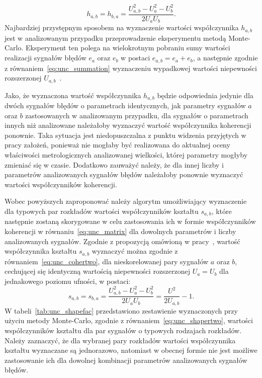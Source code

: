 \begin{equation}
h_{a,b} = h_{b,a} = \frac{U_{a,b}^{2} - U_{a}^{2} - U_{b}^{2}}{2 U_{a} U_{b}} \label{eq:unc_cohertwo}.
\end{equation}
Najbardziej przystępnym sposobem na wyznaczenie wartości współczynnika $h_{a,b}$ jest w analizowanym przypadku przeprowadzenie eksperymentu metodą Monte-Carlo. Eksperyment ten polega na wielokrotnym pobraniu sumy wartości realizacji sygnałów błędów $e_{a}$ oraz $e_{b}$ w postaci $e_{a,b} = e_{a} + e_{b}$, a następnie zgodnie z równaniem~\eqref{eq:unc_summation} wyznaczeniu wypadkowej wartości niepewności rozszerzonej $U_{a,b}$~\cite{jcgm_montecarlo}. 

Jako, że wyznaczona wartość współczynnika $h_{a,b}$ będzie odpowiednia jedynie dla dwóch sygnałów błędów o parametrach identycznych, jak parametry sygnałów $a$ oraz $b$ zastosowanych w analizowanym przypadku, dla sygnałów o parametrach innych niż analizowane należałoby wyznaczyć wartość współczynnika koherencji ponownie. Taka sytuacja jest niedopuszczalna z punktu widzenia przyjętych w pracy założeń, ponieważ nie mogłaby być realizowana do aktualnej oceny właściwości metrologicznych analizowanej wielkości, której parametry mogłyby zmieniać się w czasie. Dodatkowo zauważyć należy, że dla innej liczby i parametrów analizowanych sygnałów błędów należałoby ponownie wyznaczyć wartości współczynników koherencji.

Wobec powyższych zaproponować należy algorytm umożliwiający wyznaczenie dla typowych par rozkładów wartości współczynników kształtu $s_{a,b}$, które następnie zostaną skorygowane w celu zastosowania ich w formie współczynników koherencji w równaniu~\eqref{eq:unc_matrix} dla dowolnych parametrów i liczby analizowanych sygnałów. Zgodnie z propozycją omówioną w pracy~\cite{jakubiec_model}, wartość współczynnika kształtu $s_{a,b}$ wyznaczyć można zgodnie z równaniem~\eqref{eq:unc_cohertwo}, dla nieskorelowanej pary sygnałów $a$ oraz $b$, cechującej się identyczną wartością niepewności rozszerzonej $U_{a} = U_{b}$ dla jednakowego poziomu ufności, w postaci:
\begin{equation}
s_{a,b} = s_{b,a} = \frac{U_{a,b}^{2} - U_{a}^{2} - U_{b}^{2}}{2 U_{a} U_{b}} = \frac{U^{2}}{2 U_{a,b}} - 1 \label{eq:unc_shapertwo}.
\end{equation}
W tabeli~\ref{tab:unc_shapefac} przedstawiono zestawienie wyznaczonych przy użyciu metody Monte-Carlo, zgodnie z równaniem~\eqref{eq:unc_shapertwo}, wartości współczynników kształtu dla par sygnałów o typowych rodzajach rozkładów. Należy zaznaczyć, że dla wybranej pary rozkładów wartości współczynnika kształtu wyznaczane są jednorazowo, natomiast w obecnej formie nie jest możliwe zastosowanie ich dla dowolnej kombinacji parametrów analizowanych sygnałów błędów.

